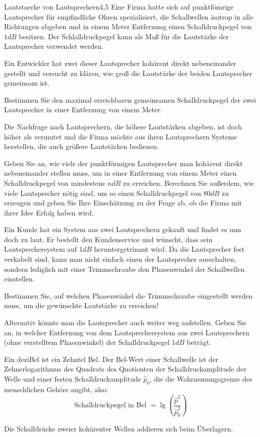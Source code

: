 \begin{problem}{Lautstaerke von Lautsprechern}{4,5}
  Eine Firma hatte sich auf punktfömrige Lautsprecher für empfindliche Ohren spezialisiert, die Schallwellen isotrop in alle Richtungen abgeben und in einem Meter Entfernung einen Schalldruckpegel von $1\unit{dB}$ besitzen. Der Schlalldruckpegel kann als Maß für die Lautstärke der Lautsprecher verwendet werden.
  \begin{abcenum}
    \item Ein Entwickler hat zwei dieser Lautsprecher kohärent direkt nebeneinander gestellt und versucht zu klären, wie groß die Lautstärke der beiden Lautsprecher gemeinsam ist.

Bestimmen Sie den maximal erreichbaren gemeinsamen Schalldruckpegel der zwei Lautsprecher in einer Entfernung von einem Meter.

\item Die Nachfrage nach Lautsprechern, die höhere Lautstärken abgeben, ist doch höher als vermutet und die Firma möchte aus ihren Lautsprechern Systeme herstellen, die auch größere Lautstärken bedienen.

Geben Sie an, wie viele der punktförmigen Lautsprecher man kohärent direkt nebeneinander stellen muss, um in einer Entfernung von einem Meter einen Schalldruckpegel von mindestens $n\unit{dB}$ zu erreichen. Berechnen Sie außerdem, wie viele Lautsprecher nötig sind, um so einen Schalldruckpegel von $80\unit{dB}$ zu erzeugen und geben Sie Ihre Einschätzung zu der Frage ab, ob die Firma mit ihrer Idee Erfolg haben wird.

\item Ein Kunde hat ein System aus zwei Lautsprechern gekauft und findet es nun doch zu laut.  Er bestellt den Kundenservice und wünscht, dass sein Lautsprechersystem auf $1\unit{dB}$ heruntergetrimmt wird.  Da die Lautsprecher fest verkabelt sind, kann man nicht einfach einen der Lautsprecher ausschalten, sondern lediglich mit einer Trimmschraube den Phasenwinkel der Schallwellen einstellen.

Bestimmen Sie, auf welchen Phasenwinkel die Trimmschraube eingestellt werden muss, um die gewünschte Lautstärke zu erreichen!

Alternativ könnte man die Lautsprecher auch weiter weg aufstellen.  Geben Sie an, in welcher Entfernung von dem Lautsprechersystem aus zwei Lautsprechern (ohne verstelltem Phasenwinkel) der Schalldruckpegel $1 \unit{dB}$ beträgt.
  \end{abcenum}

\hinweis Ein deziBel ist ein Zehntel Bel.  Der Bel-Wert einer Schallwelle ist der Zehnerlogarithmus des Quadrats des Quotienten der Schalldruckamplitude der Welle und einer festen Schalldruckamplitude $\hat{p}_0$, die die Wahrnemungsgrenze des menschlichen Gehörs angibt, also:
\begin{equation*}
  \mbox{Schalldruckpegel in Bel\ } = \lg\left(\frac{\hat{p}^2}{\hat{p}_0^2}\right)
\end{equation*}

Die Schalldrücke zweier kohärenter Wellen addieren sich beim Überlagern.
\end{problem}


